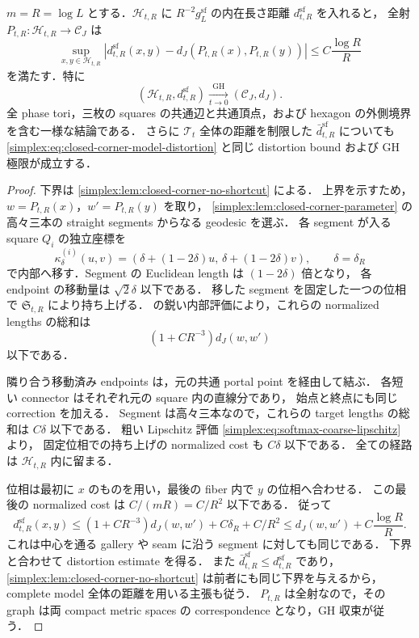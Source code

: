 \begin{theorem}
\label{simplex:thm:closed-corner-model}
$m=R=\log L$ とする．$\mathscr H_{t,R}$ に
$R^{-2}g_L^{\mathrm{sf}}$ の内在長さ距離 $d_{t,R}^{\mathrm{sf}}$ を入れると，
全射 $P_{t,R}:\mathscr H_{t,R}\to\mathcal C_J$ は
\begin{equation}\label{simplex:eq:closed-corner-model-distortion}
 \sup_{x,y\in\mathscr H_{t,R}}
 \left|d_{t,R}^{\mathrm{sf}}(x,y)
       -d_J(P_{t,R}(x),P_{t,R}(y))\right|
 \le C\frac{\log R}R
\end{equation}
を満たす．特に
\[
 (\mathscr H_{t,R},d_{t,R}^{\mathrm{sf}})
 \xrightarrow[t\to0]{\mathrm{GH}}(\mathcal C_J,d_J).
\]
全 phase tori，三枚の squares の共通辺と共通頂点，および
hexagon の外側境界を含む一様な結論である．
さらに $\mathscr T_t$ 全体の距離を制限した
$\bar d_{t,R}^{\mathrm{sf}}$ についても
\eqref{simplex:eq:closed-corner-model-distortion} と同じ distortion bound
および GH 極限が成立する．
\end{theorem}

\begin{proof}
下界は \cref{simplex:lem:closed-corner-no-shortcut} による．
上界を示すため，$w=P_{t,R}(x)$，$w'=P_{t,R}(y)$ を取り，
\cref{simplex:lem:closed-corner-parameter} の高々三本の
straight segments からなる geodesic を選ぶ．
各 segment が入る square $Q_i$ の独立座標を
\[
 \kappa_\delta^{(i)}(u,v)
   =(\delta+(1-2\delta)u,\,
      \delta+(1-2\delta)v),
 \qquad \delta=\delta_R
\]
で内部へ移す．Segment の Euclidean length は $(1-2\delta)$ 倍となり，
各 endpoint の移動量は $\sqrt2\delta$ 以下である．
移した segment を固定した一つの位相で $\mathfrak S_{t,R}$ により持ち上げる．
 の鋭い内部評価により，これらの
normalized lengths の総和は
\[
 (1+CR^{-3})d_J(w,w')
\]
以下である．

隣り合う移動済み endpoints は，元の共通 portal point を経由して結ぶ．
各短い connector はそれぞれ元の square 内の直線分であり，
始点と終点にも同じ correction を加える．
Segment は高々三本なので，これらの target lengths の総和は $C\delta$ 以下である．
粗い Lipschitz 評価 \eqref{simplex:eq:softmax-coarse-lipschitz} より，
固定位相での持ち上げの normalized cost も $C\delta$ 以下である．
全ての経路は $\mathscr H_{t,R}$ 内に留まる．

位相は最初に $x$ のものを用い，最後の fiber 内で $y$ の位相へ合わせる．
この最後の normalized cost は $C/(mR)=C/R^2$ 以下である．
従って
\[
 d_{t,R}^{\mathrm{sf}}(x,y)
 \le(1+CR^{-3})d_J(w,w')
       +C\delta_R+C/R^2
 \le d_J(w,w')+C\frac{\log R}R .
\]
これは中心を通る gallery や seam に沿う segment に対しても同じである．
下界と合わせて distortion estimate を得る．
また $\bar d_{t,R}^{\mathrm{sf}}\le d_{t,R}^{\mathrm{sf}}$ であり，
\cref{simplex:lem:closed-corner-no-shortcut} は前者にも同じ下界を与えるから，
complete model 全体の距離を用いる主張も従う．
$P_{t,R}$ は全射なので，その graph は両 compact metric spaces の
correspondence となり，GH 収束が従う．
\end{proof}

